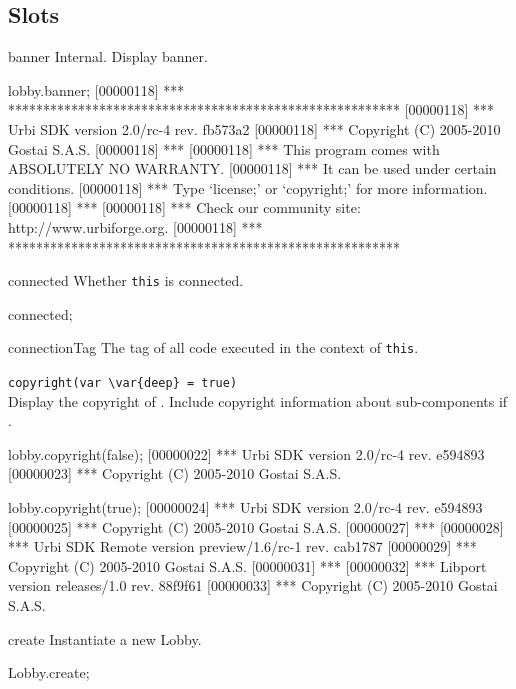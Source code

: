 \subsection{Slots}
\begin{urbiscriptapi}
\item[banner] Internal.  Display \usdk banner.
\begin{urbiscript}
lobby.banner;
[00000118] *** ********************************************************
[00000118] *** Urbi SDK version 2.0/rc-4 rev. fb573a2
[00000118] *** Copyright (C) 2005-2010 Gostai S.A.S.
[00000118] ***
[00000118] *** This program comes with ABSOLUTELY NO WARRANTY.
[00000118] *** It can be used under certain conditions.
[00000118] *** Type `license;' or `copyright;' for more information.
[00000118] ***
[00000118] *** Check our community site: http://www.urbiforge.org.
[00000118] *** ********************************************************
\end{urbiscript}

\item[connected]
  Whether \lstinline|this| is connected.
\begin{urbiassert}
connected;
\end{urbiassert}

\item[connectionTag]
  The tag of all code executed in the context of \lstinline|this|.

\item \lstinline|copyright(var \var{deep} = true)|~\\
  Display the copyright of \usdk.  Include copyright information
  about sub-components if .
\begin{urbiscript}
lobby.copyright(false);
[00000022] *** Urbi SDK version 2.0/rc-4 rev. e594893
[00000023] *** Copyright (C) 2005-2010 Gostai S.A.S.

lobby.copyright(true);
[00000024] *** Urbi SDK version 2.0/rc-4 rev. e594893
[00000025] *** Copyright (C) 2005-2010 Gostai S.A.S.
[00000027] ***
[00000028] *** Urbi SDK Remote version preview/1.6/rc-1 rev. cab1787
[00000029] *** Copyright (C) 2005-2010 Gostai S.A.S.
[00000031] ***
[00000032] *** Libport version releases/1.0 rev. 88f9f61
[00000033] *** Copyright (C) 2005-2010 Gostai S.A.S.
\end{urbiscript}

\item[create]
  Instantiate a new Lobby.
\begin{urbiassert}
Lobby.create;
\end{urbiassert}


\end{urbiscriptapi}
